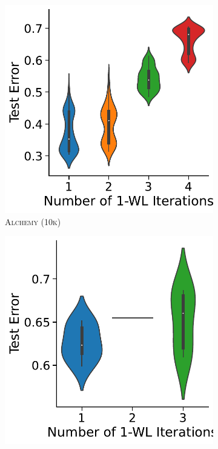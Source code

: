 \begin{figure}[thb]
\begin{subfigure}[b]{0.19\textwidth}
        \caption{\scriptsize \reddit}
	\end{subfigure}
	\hfill
	\begin{subfigure}[b]{0.19\textwidth}
		\centering
		\includegraphics[width=\textwidth]{Figures/k_wl_violin_Alchemy10K.pdf}
        \caption{\scriptsize\textsc{Alchemy (10k)}}
	\end{subfigure}
	\hfill
	\begin{subfigure}[b]{0.19\textwidth}
		\centering
		\includegraphics[width=\textwidth]{Figures/k_wl_violin_Alchemy.pdf}

\end{subfigure}
\end{figure}
